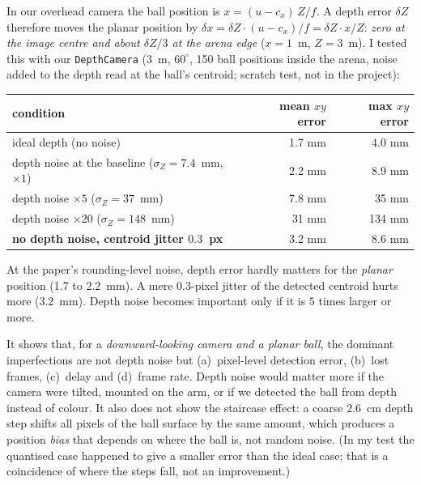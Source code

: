 \documentclass[11pt,a4paper]{article}
\begin{document}
\begin{toy}
In our overhead camera the ball position is $x=(u-c_x)\,Z/f$. A depth error $\delta Z$ therefore
moves the planar position by $\delta x=\delta Z\cdot (u-c_x)/f = \delta Z\cdot x/Z$: \emph{zero at
the image centre and about $\delta Z/3$ at the arena edge} ($x=1$~m, $Z=3$~m). I tested this with
our \texttt{DepthCamera} (3~m, $60^{\circ}$, 150 ball positions inside the arena, noise added to
the depth read at the ball's centroid; scratch test, not in the project):
\begin{center}\small
\begin{tabular}{@{}lrr@{}}
\toprule
condition & mean $xy$ error & max $xy$ error \\
\midrule
ideal depth (no noise) & 1.7 mm & 4.0 mm \\
depth noise at the baseline ($\sigma_Z=7.4$~mm, $\times1$) & 2.2 mm & 8.9 mm \\
depth noise $\times5$ ($\sigma_Z=37$~mm) & 7.8 mm & 35 mm \\
depth noise $\times20$ ($\sigma_Z=148$~mm) & 31 mm & 134 mm \\
\textbf{no depth noise, centroid jitter $0.3$~px} & 3.2 mm & 8.6 mm \\
\bottomrule
\end{tabular}
\end{center}
At the paper's rounding-level noise, depth error hardly matters for the \emph{planar} position
(1.7 to 2.2~mm). A mere $0.3$-pixel jitter of the detected centroid hurts more (3.2~mm). Depth noise
becomes important only if it is $5$ times larger or more.
\end{toy}

\begin{warn}
It shows that, for a \emph{downward-looking camera and a planar ball}, the dominant imperfections
are not depth noise but (a)~pixel-level detection error, (b)~lost frames, (c)~delay and
(d)~frame rate. Depth noise would matter more if the camera were tilted, mounted on the arm, or if
we detected the ball from depth instead of colour. It also does not show the staircase effect:
a coarse $2.6$~cm depth step shifts all pixels of the ball surface by the same amount, which
produces a position \emph{bias} that depends on where the ball is, not random noise. (In my test
the quantised case happened to give a smaller error than the ideal case; that is a coincidence of
where the steps fall, not an improvement.)
\end{warn}
\end{document}
